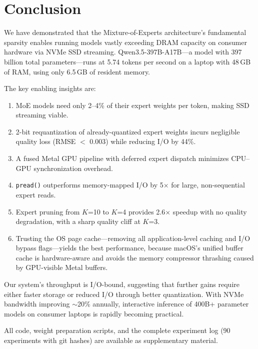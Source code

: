 \documentclass[11pt,twocolumn]{article}
\begin{document}
\section{Conclusion}

We have demonstrated that the Mixture-of-Experts architecture's fundamental sparsity enables running models vastly exceeding DRAM capacity on consumer hardware via NVMe SSD streaming.
Qwen3.5-397B-A17B---a model with 397 billion total parameters---runs at 5.74 tokens per second on a laptop with 48\,GB of RAM, using only 6.5\,GB of resident memory.

The key enabling insights are:
\begin{enumerate}[leftmargin=*,itemsep=2pt]
    \item MoE models need only 2--4\% of their expert weights per token, making SSD streaming viable.
    \item 2-bit requantization of already-quantized expert weights incurs negligible quality loss (RMSE $<$ 0.003) while reducing I/O by 44\%.
    \item A fused Metal GPU pipeline with deferred expert dispatch minimizes CPU--GPU synchronization overhead.
    \item \texttt{pread()} outperforms memory-mapped I/O by 5$\times$ for large, non-sequential expert reads.
    \item Expert pruning from $K$=10 to $K$=4 provides 2.6$\times$ speedup with no quality degradation, with a sharp quality cliff at $K$=3.
    \item Trusting the OS page cache---removing all application-level caching and I/O bypass flags---yields the best performance, because macOS's unified buffer cache is hardware-aware and avoids the memory compressor thrashing caused by GPU-visible Metal buffers.
\end{enumerate}

Our system's throughput is I/O-bound, suggesting that further gains require either faster storage or reduced I/O through better quantization.
With NVMe bandwidth improving $\sim$20\% annually, interactive inference of 400B+ parameter models on consumer laptops is rapidly becoming practical.

All code, weight preparation scripts, and the complete experiment log (90 experiments with git hashes) are available as supplementary material.

\end{document}
